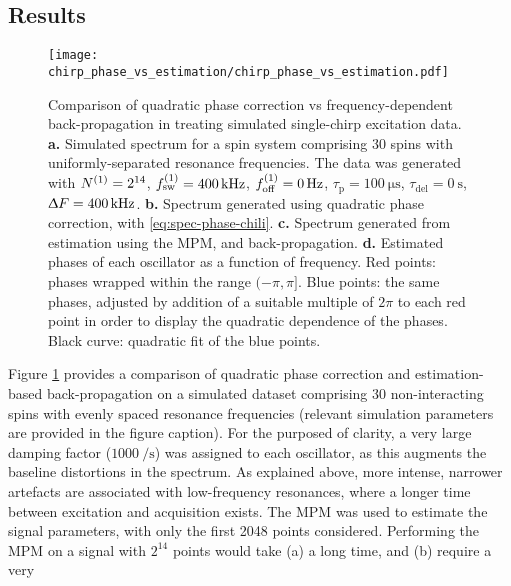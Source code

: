 \subsection{Results}
\begin{figure}
    \centering
    \texttt{[image: chirp\_phase\_vs\_estimation/chirp\_phase\_vs\_estimation.pdf]}
    \caption[
        Comparison of quadratic phase correction vs frequency-dependent
        back-propagation in treating simulated single-chirp excitation data.
    ]
    {
        Comparison of quadratic phase correction vs frequency-dependent
        back-propagation in treating simulated single-chirp excitation data.
        \textbf{a.} Simulated spectrum for a spin system comprising 30 spins
        with uniformly-separated resonance frequencies. The data was generated
        with
        $N^{(1)}=2^{14}$,
        $f_{\mathrm{sw}}^{(1)}=\qty{400}{\kilo\hertz}$,
        $f_{\mathrm{off}}^{(1)}=\qty{0}{\hertz}$,
        $\tau_{\text{p}} = \qty{100}{\micro\second}$,
        $\tau_{\text{del}} = \qty{0}{\second}$,
        $\Updelta F = \qty{400}{\kilo\hertz}$.
        \textbf{b.} Spectrum generated using quadratic phase correction, with
        \eqref{eq:spec-phase-chili}.
        \textbf{c.} Spectrum generated from estimation using the \ac{MPM}, and
        back-propagation.
        \textbf{d.} Estimated phases of each oscillator as a function of
        frequency. Red points: phases wrapped within the range $(-\pi, \pi]$.
        Blue points: the same phases, adjusted by addition of a suitable multiple
        of $2 \pi$ to each red point in order to display the quadratic
        dependence of the phases. Black curve: quadratic fit of the blue
        points.
    }
    \label{fig:bbqchili-sim}
\end{figure}
Figure \ref{fig:bbqchili-sim} provides a comparison of
quadratic phase correction and estimation-based back-propagation on a
simulated dataset comprising 30 non-interacting spins with evenly spaced
resonance frequencies (relevant simulation parameters are provided in the
figure caption). For the purposed of clarity, a very large damping factor
($\qty{1000}{\per\second}$) was assigned to each oscillator, as this augments
the baseline distortions in the spectrum. As explained above, more intense,
narrower artefacts are associated with
low-frequency resonances, where a longer time between excitation and
acquisition exists. The \ac{MPM} was used to estimate the signal parameters,
with only the first 2048 points considered. Performing the \ac{MPM} on a signal
with $2^{14}$ points would take (a) a long time, and (b) require a very
